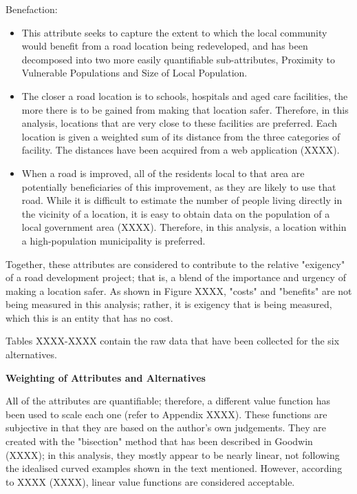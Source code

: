 \documentclass[11pt, a4paper]{article}
\begin{document}
    Benefaction:
    \begin{itemize}
        \item This attribute seeks to capture the extent to which the local community would benefit from a road location being redeveloped, and has been decomposed into two more easily quantifiable sub-attributes, Proximity to Vulnerable Populations and Size of Local Population.
        \item The closer a road location is to schools, hospitals and aged care facilities, the more there is to be gained from making that location safer. Therefore, in this analysis, locations that are very close to these facilities are preferred. Each location is given a weighted sum of its distance from the three categories of facility. The distances have been acquired from a web application (XXXX).
        \item When a road is improved, all of the residents local to that area are potentially beneficiaries of this improvement, as they are likely to use that road. While it is difficult to estimate the number of people living directly in the vicinity of a location, it is easy to obtain data on the population of a local government area (XXXX). Therefore, in this analysis, a location within a high-population municipality is preferred.
    \end{itemize}

    Together, these attributes are considered to contribute to the relative "exigency" of a road development project; that is, a blend of the importance and urgency of making a location safer. As shown in Figure XXXX, "costs" and "benefits" are not being measured in this analysis; rather, it is exigency that is being measured, which this is an entity that has no cost.

    Tables XXXX-XXXX contain the raw data that have been collected for the six alternatives.

    \textbf{Weighting of Attributes and Alternatives}

    All of the attributes are quantifiable; therefore, a different value function has been used to scale each one (refer to Appendix XXXX). These functions are subjective in that they are based on the author's own judgements. They are created with the "bisection" method that has been described in Goodwin (XXXX); in this analysis, they mostly appear to be nearly linear, not following the idealised curved examples shown in the text mentioned. However, according to XXXX (XXXX), linear value functions are considered acceptable.
\end{document}

